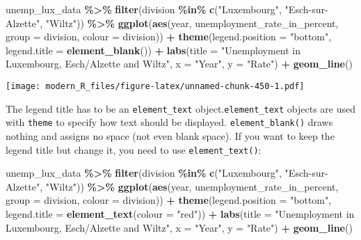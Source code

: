 \documentclass[
]{article}
\newenvironment{Shaded}{\begin{snugshade}}{\end{snugshade}}
\newcommand{\DataTypeTok}[1]{\textcolor[rgb]{0.13,0.29,0.53}{#1}}
\newcommand{\KeywordTok}[1]{\textcolor[rgb]{0.13,0.29,0.53}{\textbf{#1}}}
\newcommand{\NormalTok}[1]{#1}
\newcommand{\OperatorTok}[1]{\textcolor[rgb]{0.81,0.36,0.00}{\textbf{#1}}}
\newcommand{\StringTok}[1]{\textcolor[rgb]{0.31,0.60,0.02}{#1}}
\begin{document}
\begin{Shaded}
\begin{Highlighting}[]
\NormalTok{unemp\_lux\_data }\OperatorTok{\%\textgreater{}\%}
\StringTok{  }\KeywordTok{filter}\NormalTok{(division }\OperatorTok{\%in\%}\StringTok{ }\KeywordTok{c}\NormalTok{(}\StringTok{"Luxembourg"}\NormalTok{, }\StringTok{"Esch{-}sur{-}Alzette"}\NormalTok{, }\StringTok{"Wiltz"}\NormalTok{)) }\OperatorTok{\%\textgreater{}\%}
\StringTok{  }\KeywordTok{ggplot}\NormalTok{(}\KeywordTok{aes}\NormalTok{(year, unemployment\_rate\_in\_percent, }\DataTypeTok{group =}\NormalTok{ division, }\DataTypeTok{colour =}\NormalTok{ division)) }\OperatorTok{+}
\StringTok{  }\KeywordTok{theme}\NormalTok{(}\DataTypeTok{legend.position =} \StringTok{"bottom"}\NormalTok{, }\DataTypeTok{legend.title =} \KeywordTok{element\_blank}\NormalTok{()) }\OperatorTok{+}
\StringTok{  }\KeywordTok{labs}\NormalTok{(}\DataTypeTok{title =} \StringTok{"Unemployment in Luxembourg, Esch/Alzette and Wiltz"}\NormalTok{, }\DataTypeTok{x =} \StringTok{"Year"}\NormalTok{, }\DataTypeTok{y =} \StringTok{"Rate"}\NormalTok{) }\OperatorTok{+}
\StringTok{  }\KeywordTok{geom\_line}\NormalTok{()}
\end{Highlighting}
\end{Shaded}

\texttt{[image: modern\_R\_files/figure-latex/unnamed-chunk-450-1.pdf]}

The legend title has to be an \texttt{element\_text} object.\texttt{element\_text} objects are used with \texttt{theme} to
specify how text should be displayed. \texttt{element\_blank()} draws nothing and assigns no space (not
even blank space). If you want to keep the legend title but change it, you need to use \texttt{element\_text()}:

\begin{Shaded}
\begin{Highlighting}[]
\NormalTok{unemp\_lux\_data }\OperatorTok{\%\textgreater{}\%}
\StringTok{  }\KeywordTok{filter}\NormalTok{(division }\OperatorTok{\%in\%}\StringTok{ }\KeywordTok{c}\NormalTok{(}\StringTok{"Luxembourg"}\NormalTok{, }\StringTok{"Esch{-}sur{-}Alzette"}\NormalTok{, }\StringTok{"Wiltz"}\NormalTok{)) }\OperatorTok{\%\textgreater{}\%}
\StringTok{  }\KeywordTok{ggplot}\NormalTok{(}\KeywordTok{aes}\NormalTok{(year, unemployment\_rate\_in\_percent, }\DataTypeTok{group =}\NormalTok{ division, }\DataTypeTok{colour =}\NormalTok{ division)) }\OperatorTok{+}
\StringTok{  }\KeywordTok{theme}\NormalTok{(}\DataTypeTok{legend.position =} \StringTok{"bottom"}\NormalTok{, }\DataTypeTok{legend.title =} \KeywordTok{element\_text}\NormalTok{(}\DataTypeTok{colour =} \StringTok{"red"}\NormalTok{)) }\OperatorTok{+}
\StringTok{  }\KeywordTok{labs}\NormalTok{(}\DataTypeTok{title =} \StringTok{"Unemployment in Luxembourg, Esch/Alzette and Wiltz"}\NormalTok{, }\DataTypeTok{x =} \StringTok{"Year"}\NormalTok{, }\DataTypeTok{y =} \StringTok{"Rate"}\NormalTok{) }\OperatorTok{+}
\StringTok{  }\KeywordTok{geom\_line}\NormalTok{()}
\end{Highlighting}
\end{Shaded}
\end{document}
